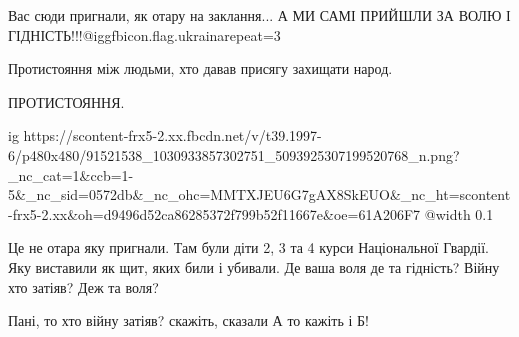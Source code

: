  
 
 
 
 

Вас сюди пригнали, як отару на заклання...
А МИ САМІ ПРИЙШЛИ ЗА ВОЛЮ І ГІДНІСТЬ!!!@igg{fbicon.flag.ukraina}{repeat=3}

Протистояння між людьми, хто давав присягу захищати народ.

ПРОТИСТОЯННЯ.

\ifcmt
  ig https://scontent-frx5-2.xx.fbcdn.net/v/t39.1997-6/p480x480/91521538_1030933857302751_5093925307199520768_n.png?_nc_cat=1&ccb=1-5&_nc_sid=0572db&_nc_ohc=MMTXJEU6G7gAX8SkEUO&_nc_ht=scontent-frx5-2.xx&oh=d9496d52ca86285372f799b52f11667e&oe=61A206F7
  @width 0.1
\fi


Це не отара яку пригнали. Там були діти 2, 3 та 4 курси Національної Гвардії.
Яку виставили як щит, яких били і убивали. Де ваша воля де та гідність? Війну
хто затіяв? Деж та воля?

Пані, то хто війну затіяв? скажіть, сказали А то кажіть і Б!
